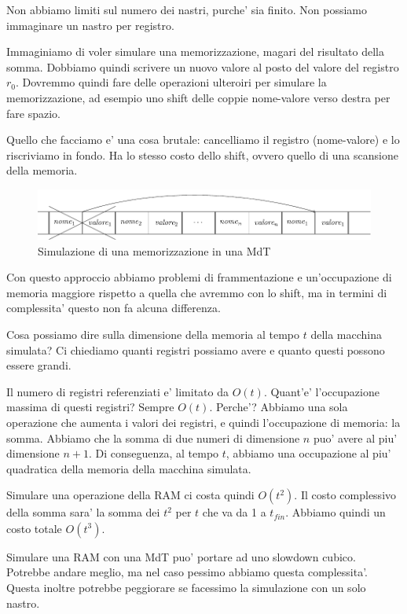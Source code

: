 Non abbiamo limiti sul numero dei nastri, purche' sia finito. Non possiamo immaginare un nastro per
registro.

Immaginiamo di voler simulare una memorizzazione, magari del risultato della somma. Dobbiamo quindi
scrivere un nuovo valore al posto del valore del registro $r_{0}$. Dovremmo quindi fare delle
operazioni ulteroiri per simulare la memorizzazione, ad esempio uno shift delle coppie nome-valore
verso destra per fare spazio.

Quello che facciamo e' una cosa brutale: cancelliamo il registro (nome-valore) e lo riscriviamo in
fondo. Ha lo stesso costo dello shift, ovvero quello di una scansione della memoria.

\begin{figure}[h]
    \begin{center}
        \includegraphics[scale=0.75]{./img/deterministic_complexity_classes/RAMstore.pdf}
        \caption{Simulazione di una memorizzazione in una MdT}
    \end{center}
\end{figure}

Con questo approccio abbiamo problemi di frammentazione e un'occupazione di memoria maggiore
rispetto a quella che avremmo con lo shift, ma in termini di complessita' questo non fa alcuna
differenza.

Cosa possiamo dire sulla dimensione della memoria al tempo $t$ della macchina simulata? Ci chiediamo
quanti registri possiamo avere e quanto questi possono essere grandi.

Il numero di registri referenziati e' limitato da $O(t)$. Quant'e' l'occupazione massima di questi
registri? Sempre $O(t)$. Perche'? Abbiamo una sola operazione che aumenta i valori dei registri, e
quindi l'occupazione di memoria: la somma. Abbiamo che la somma di due numeri di dimensione $n$ puo'
avere al piu' dimensione $n+1$. Di conseguenza, al tempo $t$, abbiamo una occupazione al piu'
quadratica della memoria della macchina simulata.

Simulare una operazione della RAM ci costa quindi $O(t^{2})$. Il costo complessivo della somma sara'
la somma dei $t^{2}$ per $t$ che va da 1 a $t_{\textit{fin}}$. Abbiamo quindi un costo totale
$O(t^{3})$.

Simulare una RAM con una MdT puo' portare ad uno slowdown cubico. Potrebbe andare meglio, ma nel
caso pessimo abbiamo questa complessita'. Questa inoltre potrebbe peggiorare se facessimo la
simulazione con un solo nastro.

